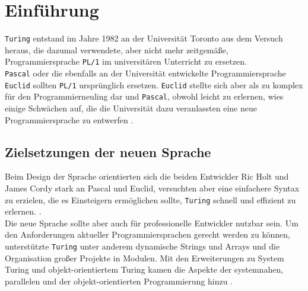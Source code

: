 \lstset{language=Turing}

\section{Einf\"uhrung}

\texttt{Turing} entstand im Jahre 1982 an der Universit\"at Toronto aus dem Versuch heraus, die dazumal verwendete, aber nicht mehr zeitgem\"a\ss{}e, Programmiersprache \texttt{PL/1} im universit\"aren Unterricht zu ersetzen. \\
\texttt{Pascal} oder die ebenfalls an der Universit\"at entwickelte Programmiersprache \texttt{Euclid} sollten \texttt{PL/1} urspr\"unglich ersetzen. \texttt{Euclid} stellte sich aber als zu komplex f\"ur den Programmierneuling dar und \texttt{Pascal}, obwohl leicht zu erlernen, wies einige Schw\"achen auf, die die Universit\"at dazu veranlassten eine neue Programmiersprache zu entwerfen \cite{Holt:88}.

\subsection{Zielsetzungen der neuen Sprache}

Beim Design der Sprache orientierten sich die beiden Entwickler Ric Holt und James Cordy stark an Pascal und Euclid, versuchten aber eine einfachere Syntax zu erzielen, die es Einsteigern erm\"oglichen sollte, \texttt{Turing} schnell und effizient zu erlernen. \cite{Hume:01}. \\
Die neue Sprache sollte aber auch f\"ur professionelle Entwickler nutzbar sein. Um den Anforderungen aktueller Programmiersprachen gerecht werden zu k\"onnen, unterst\"utzte \texttt{Turing} unter anderem dynamische Strings und Arrays und die Organisation gro\ss{}er Projekte in Modulen. Mit den Erweiterungen zu System Turing und objekt-orientiertem Turing kamen die Aspekte der systemnahen, parallelen und der objekt-orientierten Programmierung hinzu \cite{Holt:99}.

